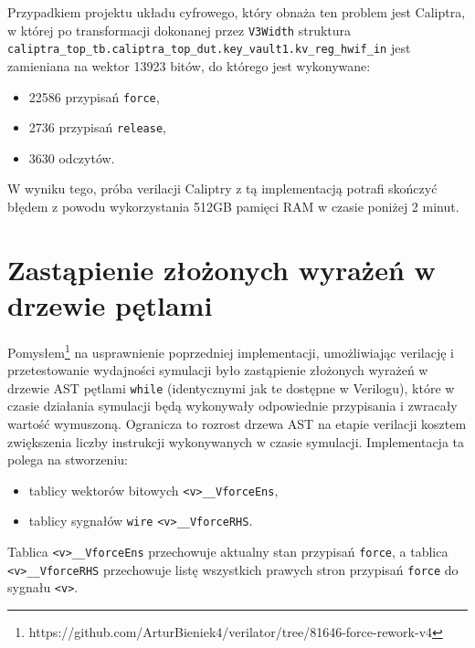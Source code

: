 \documentclass[shortabstract, inz]{iithesis}
\begin{document}
Przypadkiem projektu układu cyfrowego, który obnaża ten problem jest Caliptra,\cite{caliptra} w której po transformacji dokonanej przez \texttt{V3Width} struktura \linebreak\texttt{caliptra\_top\_tb.caliptra\_top\_dut.key\_vault1.kv\_reg\_hwif\_in} jest zamieniana na wektor 13923 bitów, do którego jest wykonywane:
\begin{itemize}
    \item 22586 przypisań \texttt{force},
    \item 2736 przypisań \texttt{release},
    \item 3630 odczytów.
\end{itemize}
W wyniku tego, próba verilacji Caliptry z tą implementacją potrafi skończyć błędem z powodu wykorzystania 512GB pamięci RAM w czasie poniżej 2 minut.

\section{Zastąpienie złożonych wyrażeń w drzewie pętlami}

Pomysłem\footnote{https://github.com/ArturBieniek4/verilator/tree/81646-force-rework-v4} na usprawnienie poprzedniej implementacji, umożliwiając verilację i przetestowanie wydajności symulacji było zastąpienie złożonych wyrażeń w drzewie AST pętlami \texttt{while} (identycznymi jak te dostępne w Verilogu), które w czasie działania symulacji będą wykonywały odpowiednie przypisania i zwracały wartość wymuszoną. Ogranicza to rozrost drzewa AST na etapie verilacji kosztem zwiększenia liczby instrukcji wykonywanych w czasie symulacji.
Implementacja ta polega na stworzeniu:
\begin{itemize}
    \item tablicy wektorów bitowych \texttt{<v>\_\_VforceEns},
    \item tablicy sygnałów \texttt{wire} \texttt{<v>\_\_VforceRHS}.
\end{itemize}

Tablica \texttt{<v>\_\_VforceEns} przechowuje aktualny stan przypisań \texttt{force}, a tablica \texttt{<v>\_\_VforceRHS} przechowuje listę wszystkich prawych stron przypisań \texttt{force} do sygnału \texttt{<v>}.
\end{document}
